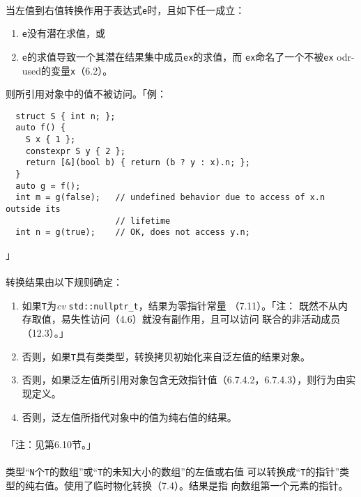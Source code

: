 \paragraph{}
当左值到右值转换作用于表达式\texttt{e}时，且如下任一成立：
\begin{enumerate}
  \item{\texttt{e}没有潜在求值，或}
  \item{\texttt{e}的求值导致一个其潜在结果集中成员\texttt{ex}的求值，而
    \texttt{ex}命名了一个不被\texttt{ex} odr-used的变量\texttt{x}（6.2）。}
\end{enumerate}
则所引用对象中的值不被访问。「例：
\begin{lstlisting}
  struct S { int n; };
  auto f() {
    S x { 1 };
    constexpr S y { 2 };
    return [&](bool b) { return (b ? y : x).n; };
  }
  auto g = f();
  int m = g(false);   // undefined behavior due to access of x.n outside its
                      // lifetime
  int n = g(true);    // OK, does not access y.n;
\end{lstlisting}」

\paragraph{}
转换结果由以下规则确定：
\begin{enumerate}
  \item{如果\texttt{T}为\textit{cv} \texttt{std::nullptr\_t}，结果为零指针常量
    （7.11）。「注： 既然不从内存取值，易失性访问（4.6）就没有副作用，且可以访问
    联合的非活动成员（12.3）。」}
  \item{否则，如果\texttt{T}具有类类型，转换拷贝初始化来自泛左值的结果对象。}
  \item{否则，如果泛左值所引用对象包含无效指针值（6.7.4.2，6.7.4.3），则行为由实
    现定义。}
  \item{否则，泛左值所指代对象中的值为纯右值的结果。}
\end{enumerate}

\paragraph{}
「注：见第6.10节。」

\paragraph{}
类型``\texttt{N}个\texttt{T}的数组''或``\texttt{T}的未知大小的数组''的左值或右值
可以转换成``\texttt{T}的指针''类型的纯右值。使用了临时物化转换（7.4）。结果是指
向数组第一个元素的指针。

